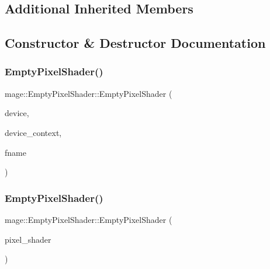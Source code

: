 \subsection*{Additional Inherited Members}


\subsection{Constructor \& Destructor Documentation}
\hypertarget{classmage_1_1_empty_pixel_shader_a7ef10491614de6eaa31d7845094d34a1}{}\label{classmage_1_1_empty_pixel_shader_a7ef10491614de6eaa31d7845094d34a1} 
\subsubsection{\texorpdfstring{Empty\+Pixel\+Shader()}{EmptyPixelShader()}\hspace{0.1cm}{\footnotesize\ttfamily [1/3]}}
{\footnotesize\ttfamily mage\+::\+Empty\+Pixel\+Shader\+::\+Empty\+Pixel\+Shader (\begin{DoxyParamCaption}\item[{I\+D3\+D11\+Device2 $\ast$}]{device,  }\item[{I\+D3\+D11\+Device\+Context2 $\ast$}]{device\+\_\+context,  }\item[{const wstring \&}]{fname }\end{DoxyParamCaption})\hspace{0.3cm}{\ttfamily [explicit]}}

\hypertarget{classmage_1_1_empty_pixel_shader_a5eaa8370d531fcc7877cc706bc8fbcce}{}\label{classmage_1_1_empty_pixel_shader_a5eaa8370d531fcc7877cc706bc8fbcce} 
\subsubsection{\texorpdfstring{Empty\+Pixel\+Shader()}{EmptyPixelShader()}\hspace{0.1cm}{\footnotesize\ttfamily [2/3]}}
{\footnotesize\ttfamily mage\+::\+Empty\+Pixel\+Shader\+::\+Empty\+Pixel\+Shader (\begin{DoxyParamCaption}\item[{const \hyperlink{classmage_1_1_empty_pixel_shader}{Empty\+Pixel\+Shader} \&}]{pixel\+\_\+shader }\end{DoxyParamCaption})\hspace{0.3cm}{\ttfamily [delete]}}


